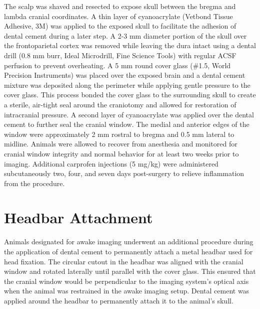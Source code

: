 The scalp was shaved and resected to expose skull between the bregma and lambda cranial coordinates. A thin layer of cyanoacrylate (Vetbond Tissue Adhesive, 3M) was applied to the exposed skull to facilitate the adhesion of dental cement during a later step. A 2-3 mm diameter portion of the skull over the frontoparietal cortex was removed while leaving the dura intact using a dental drill (0.8 mm burr, Ideal Microdrill, Fine Science Tools) with regular ACSF perfusion to prevent overheating. A 5 mm round cover glass (\#1.5, World Precision Instruments) was placed over the exposed brain and a dental cement mixture was deposited along the perimeter while applying gentle pressure to the cover glass. This process bonded the cover glass to the surrounding skull to create a sterile, air-tight seal around the craniotomy and allowed for restoration of intracranial pressure. A second layer of cyanoacrylate was applied over the dental cement to further seal the cranial window. The medial and anterior edges of the window were approximately 2 mm rostral to bregma and 0.5 mm lateral to midline. Animals were allowed to recover from anesthesia and monitored for cranial window integrity and normal behavior for at least two weeks prior to imaging. Additional carprofen injections (5 mg/kg) were administered subcutaneously two, four, and seven days post-surgery to relieve inflammation from the procedure.


\section{Headbar Attachment}

Animals designated for awake imaging underwent an additional procedure during the application of dental cement to permanently attach a metal headbar used for head fixation. The circular cutout in the headbar was aligned with the cranial window and rotated laterally until parallel with the cover glass. This ensured that the cranial window would be perpendicular to the imaging system's optical axis when the animal was restrained in the awake imaging setup. Dental cement was applied around the headbar to permanently attach it to the animal's skull.


